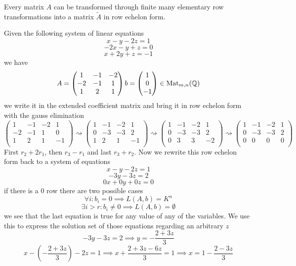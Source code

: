 \begin{theorem}
   Every matrix \(A\) can be transformed through finite many elementary row transformations into a matrix \(\tilde{A}\) in row echelon form.
\end{theorem}
\begin{example}
   Given the following system of linear equations
   \[x - y - 2z = 1\]
   \[-2x - y + z = 0\]
   \[x + 2y + z = -1\]
   we have
   \[A = \begin{pmatrix}
         1  & -1 & -2 \\
         -2 & -1 &  1 \\
         1  &  2 &  1 \\
      \end{pmatrix}
      b = \begin{pmatrix} 1 \\ 0 \\ -1\end{pmatrix} \in \operatorname{Mat}_{m,n}(\mathbb{Q})
   \]
   we write it in the extended coefficient matrix and bring it in row echelon form with the gauss elimination
   \[\begin{pmatrix}
         1  & -1 & -2 &  1 \\
         -2 & -1 &  1 &  0 \\
         1  &  2 &  1 & -1 \\
   \end{pmatrix} \rightsquigarrow \begin{pmatrix}
         1  & -1 & -2 &  1 \\
         0 & -3 &  -3 &  2 \\
         1  &  2 &  1 & -1 \\
   \end{pmatrix} \rightsquigarrow \begin{pmatrix}
         1 & -1 & -2 &  1 \\
         0 & -3 & -3 &  2 \\
         0 &  3 &  3 & -2 \\
   \end{pmatrix} \rightsquigarrow \begin{pmatrix}
         1 & -1 & -2 & 1 \\
         0 & -3 & -3 & 2 \\
         0 &  0 &  0 & 0 \\
   \end{pmatrix}\]
   First \(r_2 + 2 r_1\), then \(r_3 - r_1\) and last \(r_3 + r_2\).
   Now we rewrite this row echelon form back to a system of equations
   \[x - y - 2z = 1\]
   \[-3y - 3z = 2\]
   \[0x + 0y + 0z = 0\]
   if there is a 0 row there are two possible cases
   \[\forall i: b_i = 0 \implies L(A, b) = K^n\]
   \[\exists i > r: b_i \neq 0 \implies L(A, b) = \emptyset\]
   we see that the last equation is true for any value of any of the variables.
   We use this to express the solution set of those equations regarding an arbitrary \(z\)
   \[-3y - 3z = 2 \implies y = -\frac{2 + 3z}{3}\]
   \[x - \left(-\frac{2 + 3z}{3}\right) - 2z = 1 \implies x + \frac{2 + 3z - 6z}{3} = 1 \implies x = 1 - \frac{2 - 3z}{3}\]


\end{example}
